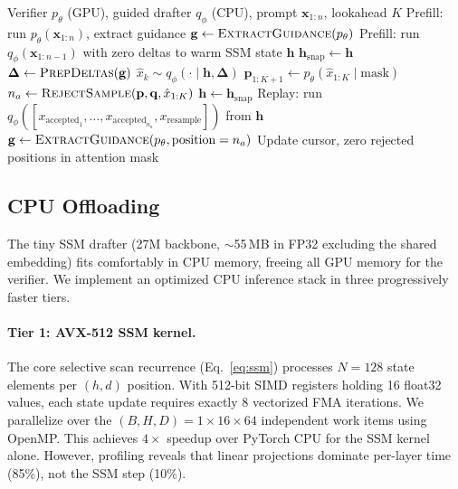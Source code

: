 \begin{algorithm}[t]
\caption{SpecSSM: Speculative decoding with guided SSM drafter and activation replay.}
\label{alg:specssm}
\begin{algorithmic}[1]
\REQUIRE Verifier $p_\theta$ (GPU), guided drafter $q_\phi$ (CPU), prompt $\mathbf{x}_{1:n}$, lookahead $K$
\STATE Prefill: run $p_\theta(\mathbf{x}_{1:n})$, extract guidance $\mathbf{g} \gets \textsc{ExtractGuidance}(p_\theta)$
\STATE Prefill: run $q_\phi(\mathbf{x}_{1:n-1})$ with zero deltas to warm SSM state $\mathbf{h}$
  \STATE $\mathbf{h}_{\mathrm{snap}} \gets \mathbf{h}$ 
  \STATE $\boldsymbol{\Delta} \gets \textsc{PrepDeltas}(\mathbf{g})$ 
    \STATE $\hat{x}_k \sim q_\phi(\cdot \mid \mathbf{h}, \boldsymbol{\Delta})$ 
  \ENDFOR
  \STATE $\mathbf{p}_{1:K+1} \gets p_\theta(\hat{x}_{1:K} \mid \text{mask})$ 
  \STATE $n_a \gets \textsc{RejectSample}(\mathbf{p}, \mathbf{q}, \hat{x}_{1:K})$ 
  \STATE $\mathbf{h} \gets \mathbf{h}_{\mathrm{snap}}$ 
  \STATE Replay: run $q_\phi([x_{\mathrm{accepted}_1}, \ldots, x_{\mathrm{accepted}_{n_a}}, x_{\mathrm{resample}}])$ from $\mathbf{h}$ 
  \STATE $\mathbf{g} \gets \textsc{ExtractGuidance}(p_\theta, \text{position}=n_a)$ 
  \STATE Update cursor, zero rejected positions in attention mask
\ENDWHILE
\end{algorithmic}
\end{algorithm}

\subsection{CPU Offloading}
\label{sec:cpu}

The tiny SSM drafter (27M backbone, $\sim$55\,MB in FP32 excluding the shared embedding) fits comfortably in CPU memory, freeing all GPU memory for the verifier.
We implement an optimized CPU inference stack in three progressively faster tiers.

\paragraph{Tier 1: AVX-512 SSM kernel.}
The core selective scan recurrence (Eq.~\ref{eq:ssm}) processes $N\!=\!128$ state elements per $(h,d)$ position.
With 512-bit SIMD registers holding 16 float32 values, each state update requires exactly 8 vectorized FMA iterations.
We parallelize over the $(B, H, D)\!=\!1{\times}16{\times}64$ independent work items using OpenMP.
This achieves $4\times$ speedup over PyTorch CPU for the SSM kernel alone.
However, profiling reveals that linear projections dominate per-layer time (85\%), not the SSM step (10\%).

